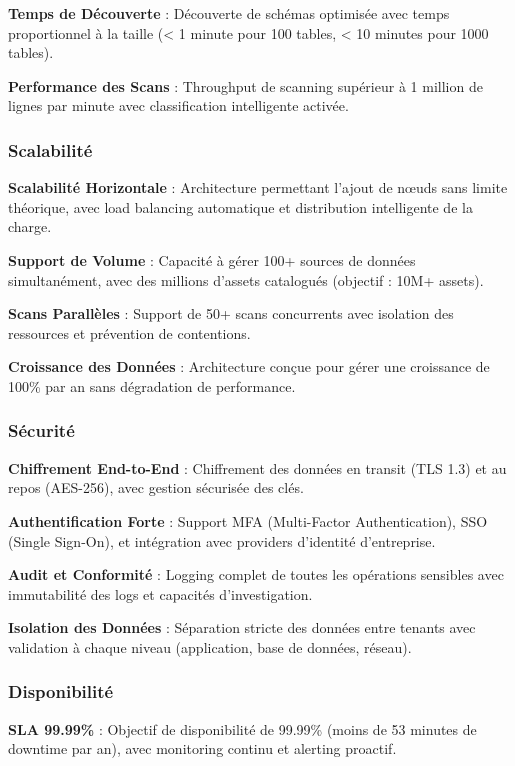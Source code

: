 \textbf{Temps de Découverte} : Découverte de schémas optimisée avec temps proportionnel à la taille (< 1 minute pour 100 tables, < 10 minutes pour 1000 tables).

\textbf{Performance des Scans} : Throughput de scanning supérieur à 1 million de lignes par minute avec classification intelligente activée.

\subsubsection{Scalabilité}

\textbf{Scalabilité Horizontale} : Architecture permettant l'ajout de nœuds sans limite théorique, avec load balancing automatique et distribution intelligente de la charge.

\textbf{Support de Volume} : Capacité à gérer 100+ sources de données simultanément, avec des millions d'assets catalogués (objectif : 10M+ assets).

\textbf{Scans Parallèles} : Support de 50+ scans concurrents avec isolation des ressources et prévention de contentions.

\textbf{Croissance des Données} : Architecture conçue pour gérer une croissance de 100\% par an sans dégradation de performance.

\subsubsection{Sécurité}

\textbf{Chiffrement End-to-End} : Chiffrement des données en transit (TLS 1.3) et au repos (AES-256), avec gestion sécurisée des clés.

\textbf{Authentification Forte} : Support MFA (Multi-Factor Authentication), SSO (Single Sign-On), et intégration avec providers d'identité d'entreprise.

\textbf{Audit et Conformité} : Logging complet de toutes les opérations sensibles avec immutabilité des logs et capacités d'investigation.

\textbf{Isolation des Données} : Séparation stricte des données entre tenants avec validation à chaque niveau (application, base de données, réseau).

\subsubsection{Disponibilité}

\textbf{SLA 99.99\%} : Objectif de disponibilité de 99.99\% (moins de 53 minutes de downtime par an), avec monitoring continu et alerting proactif.

